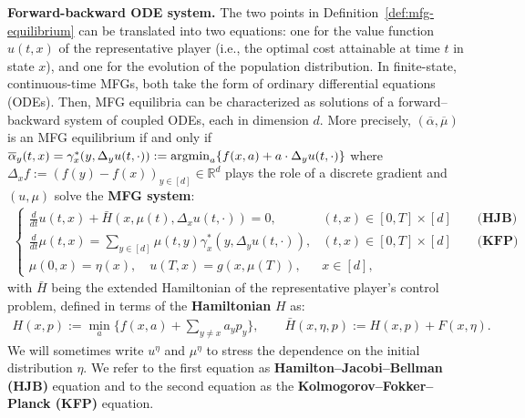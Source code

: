 \documentclass[11pt,reqno]{amsart}
\numberwithin{equation}{section}
\theoremstyle{plain}
\newcommand{\R}{\mathbb{R}}
\newcommand{\argmin}{\mathop{\rm argmin}}
\newcommand{\1}{\boldsymbol{\mathbbm{1}}}
\begin{document}
\noindent\textbf{Forward-backward ODE system.} The two points in Definition~\ref{def:mfg-equilibrium} can be translated into two equations: one for the value function $u(t, x)$ of the representative player (i.e., the optimal cost attainable at time $t$ in state $x$), and one for the evolution of the population distribution. In finite-state, continuous-time MFGs, both take the form of ordinary differential equations (ODEs). Then, 
MFG equilibria can be characterized as solutions of a forward--backward system of coupled ODEs, each in dimension $d$. More precisely, $(\overline\alpha,\overline\mu)$ is an MFG equilibrium if and only if $\overline\alpha_y(t,x) = \gamma^*_x(y,\Delta_y u (t,\cdot)) := \argmin_{a} \{f(x, a) + a \cdot \Delta_y u(t,\cdot)\}$ where $\Delta_x f := (f(y) - f(x))_{y \in [d]} \in \R^d$ plays the role of a discrete gradient and $(u,\mu)$ solve the \textbf{MFG system}:
\begin{align}
\label{eqn:mfg}
\begin{cases}
    \frac{d}{dt} u (t,x) + \bar H(x, \mu(t), \Delta_x u (t,\cdot)) = 0, & (t,x) \in [0, T] \times [d] \qquad \textbf{(HJB)} \\
    \frac{d}{dt} \mu (t,x) = \sum_{y\in [d]} \mu (t,y) \gamma^*_x(y,\Delta_y u (t,\cdot)), & (t,x) \in [0, T] \times [d] \qquad \textbf{(KFP)} \\
    \mu (0, x) = \eta(x), \quad u(T, x) = g(x, \mu(T)), & x \in [d],
\end{cases}
\end{align}
with $\bar{H}$ being the extended Hamiltonian of the representative player's control problem, defined in terms of the \textbf{Hamiltonian} $H$ as:
\begin{align}
\label{eqn:hamiltonian}
    \textstyle H(x, p) :=  \min_{a} \Big\{f(x,a) + \sum_{y \neq x} a_y p_y\Big\}, 
    \qquad
    \bar{H}(x, \eta, p) := H(x, p) + F(x, \eta).
\end{align}
We will sometimes write $u^\eta$ and $\mu^\eta$ to stress the dependence on the initial distribution $\eta$. We refer to the first equation as \textbf{Hamilton--Jacobi--Bellman (HJB)} equation and to the second equation as the \textbf{Kolmogorov--Fokker--Planck (KFP)} equation.
\end{document}
